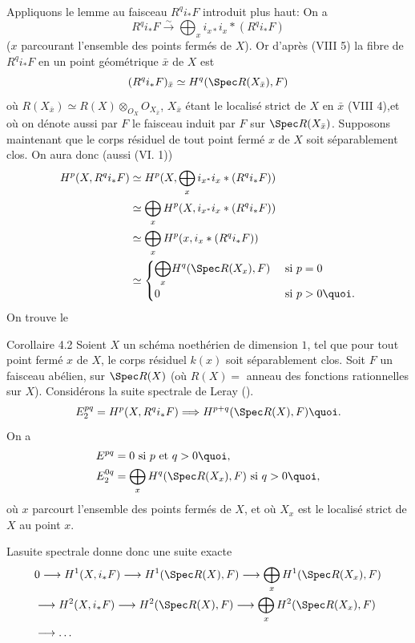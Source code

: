 \documentclass[10pt]{../fichiers-configuration-latex/smfart}
\begin{document}
\subsubsection{}
Appliquons le lemme au faisceau $R^qi_{\ast}F$ introduit plus haut: On
a
$$
R^qi_{\ast}F\xrightarrow{\sim} \bigoplus_x i_{x\ast} i_x \ast
(R^qi_{\ast}F)
$$
($x$ parcourant l'ensemble des points fermés de $X$). Or d'après (VIII
5) la fibre de $R^qi_{\ast}F$ en un point géométrique $\bar{x}$ de $X$
est
$$
(R^qi_{\ast}F)_{\bar{x}}\simeq H^q(\Spec R(X_{\bar{x}}), F)
$$
où $R(X_{\bar{x}})\simeq R(X)\otimes_{O_X}O_{X_{\bar{x}}}$,
$X_{\bar{x}}$ étant le localisé strict de $X$ en $\bar{x}$  (VIII
4),\pageoriginale et où on dénote aussi par $F$ le faisceau induit par
$F$ sur $\Spec R(X_{\bar{x}})$. Supposons maintenant que le corps
résiduel de tout point fermé $x$ de $X$ soit séparablement clos. On
aura donc (\cf aussi (VI. 1))
\begin{align*}
H^p(X,R^qi_{\ast}F) &\simeq H^p(X,\bigoplus_x i_{x^{\ast}}i_x\ast
(R^qi_{\ast}F))\\
&\simeq \bigoplus_x H^p(X, i_{x^{\ast}}i_x\ast(R^q i_{\ast}F))\\
&\simeq \bigoplus_x H^p(x,i_x\ast (R^q i_{\ast}F))\\
&\simeq \begin{cases}
         \displaystyle{\bigoplus_x} H^q(\Spec R(X_x),F) &\mbox{ si } p=0\\
          0                            &\mbox{ si } p>0{\quoi}.
         \end{cases}
\end{align*}
On trouve le

\begin{enonce*}{Corollaire 4.2}
Soient $X$ un schéma noethérien de dimension $1$, tel que pour tout
point fermé $x$ de $X$, le corps résiduel $k(x)$ soit séparablement
clos. Soit $F$ un faisceau abélien, sur $\Spec R(X)$ (où $R(X)=$
anneau des fonctions rationnelles sur $X$). Considérons la suite
spectrale de Leray (\quad).
$$
E^{pq}_2=H^p(X,R^q i_{\ast}F)\Longrightarrow H^{p+q}(\Spec R(X),
F){\quoi}.
$$
On a
\begin{align*}
E^{pq} &= 0\mbox{ si } p \mbox{ et } q> 0{\quoi},\\
E^{0q}_2 &= \bigoplus_x H^q(\Spec R(X_x),F)\mbox{ si } q>0{\quoi},
\end{align*}
où $x$ parcourt l'ensemble des points fermés de $X$, et où $X_x$ est
le localisé strict de $X$ au point $x$.

La\pageoriginale suite spectrale donne donc une suite exacte
\begin{align*}
& 0\longrightarrow H^1(X,i_{\ast}F)\longrightarrow H^1(\Spec R(X),
F)\longrightarrow \bigoplus_x H^1(\Spec R(X_x),F)\\
& \longrightarrow H^2(X,i_{\ast}F)\longrightarrow H^2(\Spec
R(X),F)\longrightarrow \bigoplus_x H^2(\Spec R(X_x),F)\\
&\longrightarrow\ldots
\end{align*}
\end{enonce*}
\end{document}
